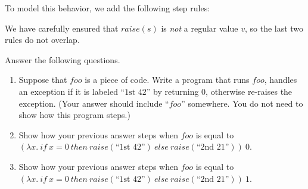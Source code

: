 \documentclass{article}
\begin{document}
To model this behavior, we add the following step rules:
%
%
We have carefully ensured that $\mathit{raise}(s)$ is \emph{not} a regular value
$v$, so the last two rules do not overlap.

Answer the following questions.
%
\begin{enumerate}
  \item Suppose that $\mathit{foo}$ is a piece of code. Write a program that
    runs $\mathit{foo}$, handles an exception if it is labeled $\text{``1st
    42''}$ by returning $0$, otherwise re-raises the exception. (Your answer
    should include ``$\mathit{foo}$'' somewhere. You do not need to show how
    this program steps.)
  \item Show how your previous answer steps when $\mathit{foo}$ is equal to
    $(\lambda x.~\mathit{if}~x = 0~\mathit{then}~\mathit{raise}(\text{``1st
    42''})~\mathit{else}~\mathit{raise}(\text{``2nd 21''}))~0$.
  \item Show how your previous answer steps when $\mathit{foo}$ is equal to
    $(\lambda x.~\mathit{if}~x = 0~\mathit{then}~\mathit{raise}(\text{``1st
    42''})~\mathit{else}~\mathit{raise}(\text{``2nd 21''}))~1$.
\end{enumerate}
\end{document}
